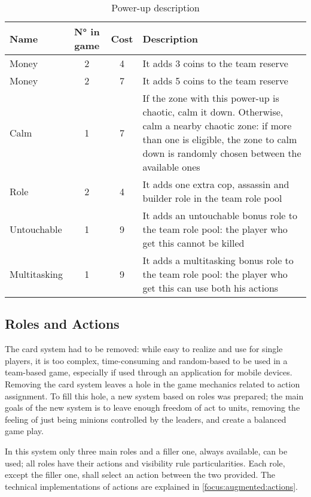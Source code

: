 			\begin{table}
				\caption{Power-up description}
				\label{powup:desc}
				\centering
				\begin{tabular}{lccp{}}
					\toprule
					Name 			& N° in game& Cost 	& Description \\
					\midrule
					Money 			& 2 		& 4 	& It adds 3 coins to the team reserve \\
					Money 			& 2 		& 7 	& It adds 5 coins to the team reserve \\
					Calm 			& 1 		& 7 	& If the zone with this power-up is chaotic, calm it down. Otherwise, calm a nearby chaotic zone: if more than one is eligible, the zone to calm down is randomly chosen between the available ones \\
					Role 			& 2 		& 4 	& It adds one extra cop, assassin and builder role in the team role pool \\
					Untouchable 	& 1 		& 9 	& It adds an untouchable bonus role to the team role pool: the player who get this cannot be killed \\
					Multitasking 	& 1 		& 9 	& It adds a multitasking bonus role to the team role pool: the player who get this can use both his actions \\
					\bottomrule
				\end{tabular}
			\end{table}
		
		\subsection{Roles and Actions}
		
			The card system had to be removed: while easy to realize and use for single players, it is too complex, time-consuming and random-based to be used in a team-based game, especially if used through an application for mobile devices.
			Removing the card system leaves a hole in the game mechanics related to action assignment. To fill this hole, a new system based on roles was prepared; the main goals of the new system is to leave enough freedom of act to units, removing the feeling of just being minions controlled by the leaders, and create a balanced game play.
			
			In this system only three main roles and a filler one, always available, can be used; all roles have their actions and visibility rule particularities.
			Each role, except the filler one, shall select an action between the two provided.
			The technical implementations of actions are explained in \autoref{focus:augmented:actions}.
		
